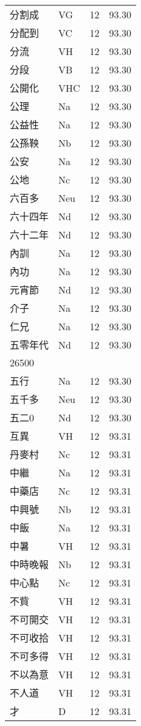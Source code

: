 \documentclass[twocolumn]{book}
\begin{document}
\begin{supertabular}{llrr}
分割成 & VG & 12 &  93.30\\
分配到 & VC & 12 &  93.30\\
分流 & VH & 12 &  93.30\\
分段 & VB & 12 &  93.30\\
公開化 & VHC & 12 &  93.30\\
公理 & Na & 12 &  93.30\\
公益性 & Na & 12 &  93.30\\
公孫鞅 & Nb & 12 &  93.30\\
公安 & Na & 12 &  93.30\\
公地 & Nc & 12 &  93.30\\
六百多 & Neu & 12 &  93.30\\
六十四年 & Nd & 12 &  93.30\\
六十二年 & Nd & 12 &  93.30\\
內訓 & Na & 12 &  93.30\\
內功 & Na & 12 &  93.30\\
元宵節 & Nd & 12 &  93.30\\
介子 & Na & 12 &  93.30\\
仁兄 & Na & 12 &  93.30\\
五零年代 & Nd & 12 &  93.30\\
26500\\
五行 & Na & 12 &  93.30\\
五千多 & Neu & 12 &  93.30\\
五二0 & Nd & 12 &  93.30\\
互異 & VH & 12 &  93.31\\
丹麥村 & Nc & 12 &  93.31\\
中繼 & Na & 12 &  93.31\\
中藥店 & Nc & 12 &  93.31\\
中興號 & Nb & 12 &  93.31\\
中飯 & Na & 12 &  93.31\\
中暑 & VH & 12 &  93.31\\
中時晚報 & Nb & 12 &  93.31\\
中心點 & Nc & 12 &  93.31\\
不貲 & VH & 12 &  93.31\\
不可開交 & VH & 12 &  93.31\\
不可收拾 & VH & 12 &  93.31\\
不可多得 & VH & 12 &  93.31\\
不以為意 & VH & 12 &  93.31\\
不人道 & VH & 12 &  93.31\\
才 & D & 12 &  93.31\\

\end{supertabular}
\end{document}

